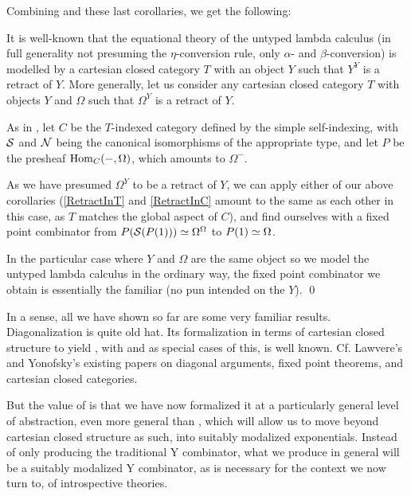Combining  and these last corollaries, we get the following:

\label{YCombinator}
It is well-known that the equational theory of the untyped lambda calculus (in full generality not presuming the $\eta$-conversion rule, only $\alpha$- and $\beta$-conversion) is modelled by a cartesian closed category $T$ with an object $Y$ such that $Y^Y$ is a retract of $Y$. More generally, let us consider any cartesian closed category $T$ with objects $Y$ and $\Omega$ such that $\Omega^Y$ is a retract of $Y$.

As in , let $C$ be the $T$-indexed category defined by the simple self-indexing, with $\mathcal{S}$ and $\mathcal{N}$ being the canonical isomorphisms of the appropriate type, and let $P$ be the presheaf $\operatorname{Hom}_C(-, \Omega)$, which amounts to $\Omega^{-}$.

As we have presumed $\Omega^Y$ to be a retract of $Y$, we can apply either of our above corollaries (\cref{RetractInT} and \cref{RetractInC} amount to the same as each other in this case, as $T$ matches the global aspect of $C$), and find ourselves with a fixed point combinator from $P(\mathcal{S}(P(1))) \simeq \Omega^{\Omega}$ to $P(1) \simeq \Omega$. 

In the particular case where $Y$ and $\Omega$ are the same object so we model the untyped lambda calculus in the ordinary way, the fixed point combinator we obtain is essentially the familiar  (no pun intended on the $Y$). \qed
{}

In a sense, all we have shown so far are some very familiar results. Diagonalization is quite old hat. Its formalization in terms of cartesian closed structure to yield , with  and  as special cases of this, is well known. Cf. Lawvere's and Yonofsky's existing papers on diagonal arguments, fixed point theorems, and cartesian closed categories. 

But the value of  is that we have now formalized it at a particularly general level of abstraction, even more general than , which will allow us to move beyond cartesian closed structure as such, into suitably modalized exponentials. Instead of only producing the traditional Y combinator, what we produce in general will be a suitably modalized Y combinator, as is necessary for the context we now turn to, of introspective theories.

